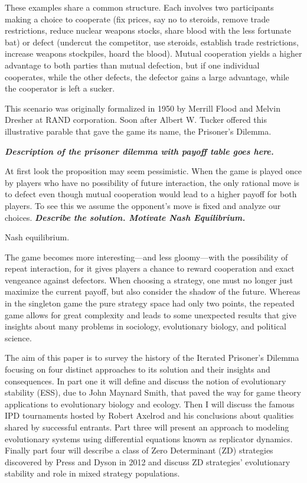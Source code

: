 These examples share a common structure. Each involves two participants making a choice to cooperate (fix prices, say no to steroids, remove trade restrictions, reduce nuclear weapons stocks, share blood with the less fortunate bat) or defect (undercut the competitor, use steroids, establish trade restrictions, increase weapons stockpiles, hoard the blood). Mutual cooperation yields a higher advantage to both parties than mutual defection, but if one individual cooperates, while the other defects, the defector gains a large advantage, while the cooperator is left a sucker.

This scenario was originally formalized in 1950 by Merrill Flood and Melvin Dresher at RAND corporation. Soon after Albert W. Tucker offered this illustrative parable that gave the game its name, the Prisoner's Dilemma.

\textit{\textbf{Description of the prisoner dilemma with payoff table goes here.}}

At first look the proposition may seem pessimistic. When the game is played once by players who have no possibility of future interaction, the only rational move is to defect even though mutual cooperation would lead to a higher payoff for both players. To see this we assume the opponent's move is fixed and analyze our choices. \textit{\textbf{Describe the solution. Motivate Nash Equilibrium.}}
\begin{definition} Nash equilibrium.
\end{definition}

The game becomes more interesting---and less gloomy---with the possibility of repeat interaction, for it gives players a chance to reward cooperation and exact vengeance against defectors. When choosing a strategy, one must no longer just maximize the current payoff, but also consider the shadow of the future. Whereas in the singleton game the pure strategy space had only two points, the repeated game allows for great complexity and leads to some unexpected results that give insights about many problems in sociology, evolutionary biology, and political science.

The aim of this paper is to survey the history of the Iterated Prisoner's Dilemma focusing on four distinct approaches to its solution and their insights and consequences. In part one it will define and discuss the notion of evolutionary stability (ESS), due to John Maynard Smith, that paved the way for game theory applications to evolutionary biology and ecology. Then I will discuss the famous IPD tournaments hosted by Robert Axelrod and his conclusions about qualities shared by successful entrants. Part three will present an approach to modeling evolutionary systems using differential equations known as replicator dynamics. Finally part four will describe a class of Zero Determinant (ZD) strategies discovered by Press and Dyson in 2012 and discuss ZD strategies' evolutionary stability and role in mixed strategy populations.


